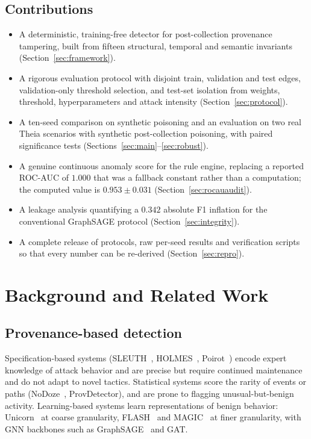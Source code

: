 \documentclass[journal]{IEEEtran}
\begin{document}
\subsection{Contributions}
\begin{itemize}
\item A deterministic, training-free detector for post-collection provenance
tampering, built from fifteen structural, temporal and semantic invariants
(Section~\ref{sec:framework}).
\item A rigorous evaluation protocol with disjoint train, validation and test
edges, validation-only threshold selection, and test-set isolation from weights,
threshold, hyperparameters and attack intensity (Section~\ref{sec:protocol}).
\item A ten-seed comparison on synthetic poisoning and an evaluation on two real
Theia scenarios with synthetic post-collection poisoning, with paired
significance tests (Sections~\ref{sec:main}--\ref{sec:robust}).
\item A genuine continuous anomaly score for the rule engine, replacing a
reported ROC-AUC of $1.000$ that was a fallback constant rather than a
computation; the computed value is $0.953\pm0.031$ (Section~\ref{sec:rocauaudit}).
\item A leakage analysis quantifying a $0.342$ absolute F1 inflation for the
conventional GraphSAGE protocol (Section~\ref{sec:integrity}).
\item A complete release of protocols, raw per-seed results and verification
scripts so that every number can be re-derived (Section~\ref{sec:repro}).
\end{itemize}

\section{Background and Related Work}
\subsection{Provenance-based detection}
Specification-based systems (SLEUTH~\cite{hossain2017sleuth},
HOLMES~\cite{milajerdi2019holmes}, Poirot~\cite{peirce2021poirot}) encode expert
knowledge of attack behavior and are precise but require continued maintenance
and do not adapt to novel tactics. Statistical systems score the rarity of
events or paths (NoDoze~\cite{hasan2021nodoze}, ProvDetector), and are prone to
flagging unusual-but-benign activity. Learning-based systems learn
representations of benign behavior: Unicorn~\cite{han2020unicorn} at coarse
granularity, FLASH~\cite{chen2021flash} and MAGIC~\cite{li2021magnet} at finer
granularity, with GNN backbones such as GraphSAGE~\cite{hamilton2017graphsage}
and GAT.
\end{document}
